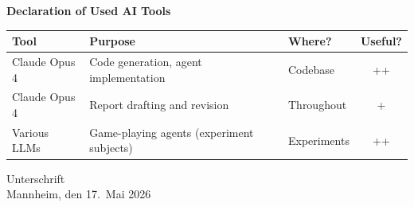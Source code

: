 \documentclass[a4paper,oneside,bibliography=totoc]{scrartcl}
\begin{document}
\begin{center}
  \textbf{Declaration of Used AI Tools} \\[.3em]
  \begin{tabularx}{\textwidth}{lXlc}
    \toprule
    Tool & Purpose & Where? & Useful? \\
    \midrule
    Claude Opus 4 & Code generation, agent implementation & Codebase & ++ \\
    Claude Opus 4 & Report drafting and revision & Throughout & + \\
    Various LLMs & Game-playing agents (experiment subjects) & Experiments & ++ \\
    \bottomrule
  \end{tabularx}
\end{center}

\vspace{2cm}
\noindent Unterschrift\\
\noindent Mannheim, den 17.~Mai 2026 \hfill
\end{document}
